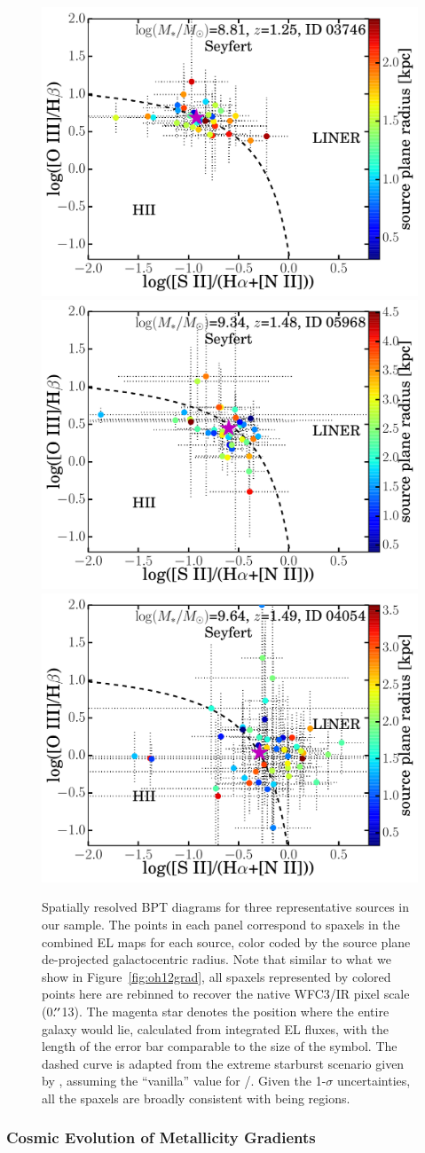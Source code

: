 \begin{figure}
    \includegraphics[width=.33\textwidth]{fig/id03746_BPT.pdf}
    \includegraphics[width=.33\textwidth]{fig/id05968_BPT.pdf}
    \includegraphics[width=.33\textwidth]{fig/id04054_BPT.pdf}
    \caption[Spatially resolved BPT diagrams.]{Spatially resolved BPT diagrams for three representative sources in our \mg
    sample.  The points in each panel correspond to spaxels in the combined EL maps for each
    source, color coded by the source plane de-projected galactocentric radius.  Note that
    similar to what we show in Figure~\ref{fig:oh12grad}, all spaxels represented by colored
    points here are rebinned to recover the native WFC3/IR pixel scale (0$\mbox{$.\!^{\prime\prime}$}$13).
    The magenta star denotes the position where the entire galaxy would lie, calculated from
    integrated EL fluxes, with the length of the error bar comparable to the size of the
    symbol. The dashed curve is adapted from the extreme starburst scenario given by
    \citet{Kewley:2006ib}, assuming the ``vanilla'' value for \NII/\Ha.
    Given the 1-$\sigma$ uncertainties, all the spaxels are broadly consistent with being
    \HII regions.}
    \label{fig:BPT}
\end{figure}

\subsubsection{Cosmic Evolution of Metallicity Gradients}\label{subsubsect:gradVSz}

